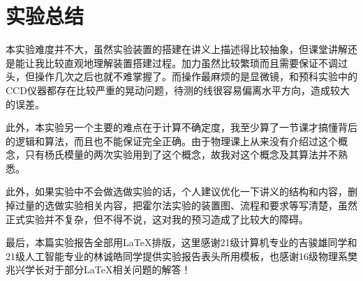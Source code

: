 \documentclass[12pt]{article}
\begin{document}
\section{实验总结}
本实验难度并不大，虽然实验装置的搭建在讲义上描述得比较抽象，但课堂讲解还是能让我比较直观地理解装置搭建过程。加力虽然比较繁琐而且需要保证不调过头，但操作几次之后也就不难掌握了。而操作最麻烦的是显微镜，和预科实验中的CCD仪器都存在比较严重的晃动问题，待测的线很容易偏离水平方向，造成较大的误差。

此外，本实验另一个主要的难点在于计算不确定度，我至少算了一节课才搞懂背后的逻辑和算法，而且也不能保证完全正确。由于物理课上从来没有介绍过这个概念，只有杨氏模量的两次实验用到了这个概念，故我对这个概念及其算法并不熟悉。

此外，如果实验中不会做选做实验的话，个人建议优化一下讲义的结构和内容，删掉过量的选做实验相关内容，把霍尔法实验的装置图、流程和要求等写清楚，虽然正式实验并不复杂，但不得不说，这对我的预习造成了比较大的障碍。

最后，本篇实验报告全部用\LaTeX{}排版，这里感谢21级计算机专业的吉骏雄同学和21级人工智能专业的林诚皓同学提供实验报告表头所用模板，也感谢16级物理系樊兆兴学长对于部分\LaTeX{}相关问题的解答！
\end{document}
